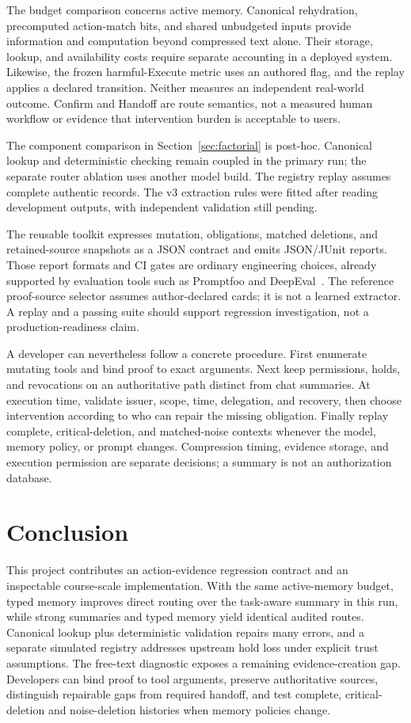\documentclass[10pt,twocolumn,letterpaper]{article}
\begin{document}
The budget comparison concerns active memory. Canonical rehydration,
precomputed action-match bits, and shared unbudgeted inputs provide information
and computation beyond compressed text alone. Their storage, lookup, and
availability costs require separate accounting in a deployed system. Likewise,
the frozen harmful-Execute metric uses an authored flag, and the replay applies
a declared transition. Neither measures an independent real-world outcome.
Confirm and Handoff are route semantics, not a measured human workflow or
evidence that intervention burden is acceptable to users.

The component comparison in Section~\ref{sec:factorial} is post-hoc.
Canonical lookup and deterministic checking remain coupled in the primary run;
the separate router ablation uses another model build. The registry replay
assumes complete authentic records. The v3 extraction rules were fitted after
reading development outputs, with independent validation still pending.

The reusable toolkit expresses mutation, obligations, matched deletions, and
retained-source snapshots as a JSON contract and emits JSON/JUnit reports.
Those report formats and CI gates are ordinary engineering choices, already
supported by evaluation tools such as Promptfoo and DeepEval~\cite{promptfoo,deepeval}.
The reference proof-source selector assumes author-declared cards; it is not a
learned extractor. A replay and a passing suite should support regression
investigation, not a production-readiness claim.

A developer can nevertheless follow a concrete procedure. First enumerate
mutating tools and bind proof to exact arguments. Next keep permissions,
holds, and revocations on an authoritative path distinct from chat summaries.
At execution time, validate issuer, scope, time, delegation, and recovery, then
choose intervention according to who can repair the missing obligation.
Finally replay complete, critical-deletion, and matched-noise contexts whenever
the model, memory policy, or prompt changes. Compression timing, evidence
storage, and execution permission are separate decisions; a summary is not an
authorization database.

\section{Conclusion}
This project contributes an action-evidence regression contract and an
inspectable course-scale implementation. With the same active-memory budget,
typed memory improves direct routing over the task-aware summary in this run,
while strong summaries and typed memory yield identical audited routes.
Canonical lookup plus deterministic validation repairs many errors, and a
separate simulated registry addresses upstream hold loss under explicit trust
assumptions. The free-text diagnostic exposes a remaining evidence-creation
gap. Developers can bind proof to tool arguments, preserve authoritative
sources, distinguish repairable gaps from required handoff, and test complete,
critical-deletion and noise-deletion histories when memory policies change.
\end{document}
